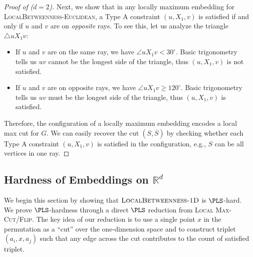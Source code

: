 \documentclass{article}
\theoremstyle{definition}  %
\theoremstyle{plain}
\numberwithin{observation}{section}
\numberwithin{claim}{section}
\numberwithin{fact}{section}
\numberwithin{lemma}{section}
\numberwithin{proposition}{section}
\numberwithin{theorem}{section}
\numberwithin{corollary}{section}
\numberwithin{definition}{section}
\renewcommand{\bar}[1]{\overline{#1}}
\newcommand{\betweeness}{\textsc{LocalBetweenness-1D}}
\theoremstyle{plain}
\begin{document}
\begin{proof}[Proof of  ($d=2$)]
Next, we show that in any locally maximum embedding for \textsc{LocalBetweenness-Euclidean}, a Type A constraint $(u, X_1, v)$ is satisfied if and only if $u$ and $v$ are on \textit{opposite} rays. To see this, let us analyze the triangle $\triangle u X_1 v$:
\begin{itemize}
\vspace{-0.2cm}
    \item If $u$ and $v$ are on the same ray, we have $\angle u X_1 v < 30 ^\circ$. Basic trigonometry tells us $uv$ cannot be the longest side of the triangle, thus $(u, X_1, v)$ is not satisfied.
    \vspace{-0.2cm}
    \item If $u$ and $v$ are on opposite rays, we have $\angle u X_1 v \geq 120 ^\circ$. Basic trigonometry tells us $uv$ must be the longest side of the triangle, thus $(u, X_1, v)$ is satisfied.
\end{itemize}
\vspace{-0.2cm}
Therefore, the configuration of a locally maximum embedding encodes a local max cut for $G$. We can easily recover the cut $(S,\bar{S})$ by checking whether each Type A constraint $(u, X_1, v)$ is satisfied in the configuration, e.g., $S$ can be all vertices in one ray.
\end{proof}

\iffalse
\subsection{Hardness of Embeddings on $\mathbb{R}^d$} \label{sec:embedding_in_Rd}

We begin this section by showing that $\betweeness$ is $\PLS$-hard. We prove $\PLS$-hardness through a direct $\PLS$ reduction from \textsc{Local Max-Cut/Flip}. The key idea of our reduction is to use a single point $x$ in the permutation as a ``cut'' over the one-dimension space and to construct triplet $(a_i, x, a_j)$ such that any edge across the cut contributes to the count of satisfied triplet.

\end{document}
